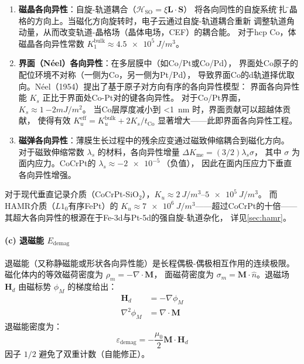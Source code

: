 \documentclass[11pt,a4paper,twoside]{article}
\theoremstyle{definition}
\theoremstyle{plain}
\theoremstyle{remark}
\begin{document}
\begin{enumerate}
  \item \textbf{磁晶各向异性}：自旋-轨道耦合（$\mathcal{H}_{\text{SO}} = \xi \mathbf{L}\cdot\mathbf{S}$）
  将各向同性的自旋系统\"钉扎\"到晶格的方向上。当磁化方向旋转时，电子云通过自旋-轨道耦合重新
  调整轨道角动量，从而改变轨道-晶格场（晶体电场，CEF）的耦合能。
  对于hcp Co，体磁晶各向异性常数 $K_1^{\text{bulk}} \approx \SI{4.5e5}{J/m^3}$。

  \item \textbf{界面（N\'{e}el）各向异性}：在多层膜中（如Co/Pt或Co/Pd），
  界面处Co原子的配位环境不对称（一侧为Co，另一侧为Pt/Pd），
  导致界面Co的d轨道择优取向。N\'{e}el（1954）提出了基于原子对方向有序的各向异性模型：
  界面各向异性能 $K_s$ 正比于界面处Co-Pt对的键各向异性。
  对于Co/Pt界面，$K_s \approx \SI{1}{-2}{mJ/m^2}$。
  当Co层厚度减小到 \SI{<1}{nm} 时，界面贡献可以超越体贡献，
  使得有效 $K_u^{\text{eff}} = K_u^{\text{bulk}} + 2K_s/t_{\text{Co}}$
  显著增大——此即界面各向异性工程。

  \item \textbf{磁弹各向异性}：薄膜生长过程中的残余应变通过磁致伸缩耦合到磁化方向。
  对于磁致伸缩常数 $\lambda_s$ 的材料，各向异性增量
  $\Delta K_{\text{me}} = (3/2) \lambda_s \sigma$，
  其中 $\sigma$ 为面内应力。CoCrPt的 $\lambda_s \approx \SI{-2e-5}{}$（负值），
  因此在面内压应力下垂直各向异性增强。
\end{enumerate}

对于现代垂直记录介质（CoCrPt-SiO$_2$），$K_u \approx \SIrange{2}{5e5}{J/m^3}$。
而HAMR介质（$L1_0$有序FePt）的 $K_u \approx \SI{7e6}{J/m^3}$——超过CoCrPt的十倍——
其超大各向异性的根源在于Fe-3d与Pt-5d的强自旋-轨道杂化，
详见\cref{sec:hamr}。

\paragraph{(c) 退磁能 $E_{\text{demag}}$}

退磁能（又称静磁能或形状各向异性能）是长程偶极-偶极相互作用的连续极限。
磁化体内的等效磁荷密度为 $\rho_m = -\nabla \cdot \mathbf{M}$，
面磁荷密度为 $\sigma_m = \mathbf{M} \cdot \hat{n}$。退磁场 $\mathbf{H}_d$ 由磁标势
$\phi_M$ 的梯度给出：
\begin{align}
  \mathbf{H}_d &= -\nabla \phi_M \label{eq:hd} \\
  \nabla^2 \phi_M &= \nabla \cdot \mathbf{M} \label{eq:poisson-mag}
\end{align}
退磁能密度为：
\begin{equation}\label{eq:demag}
  \varepsilon_{\text{demag}} = -\frac{\mu_0}{2} \mathbf{M} \cdot \mathbf{H}_d
\end{equation}
因子 $1/2$ 避免了双重计数（自能修正）。
\end{document}
